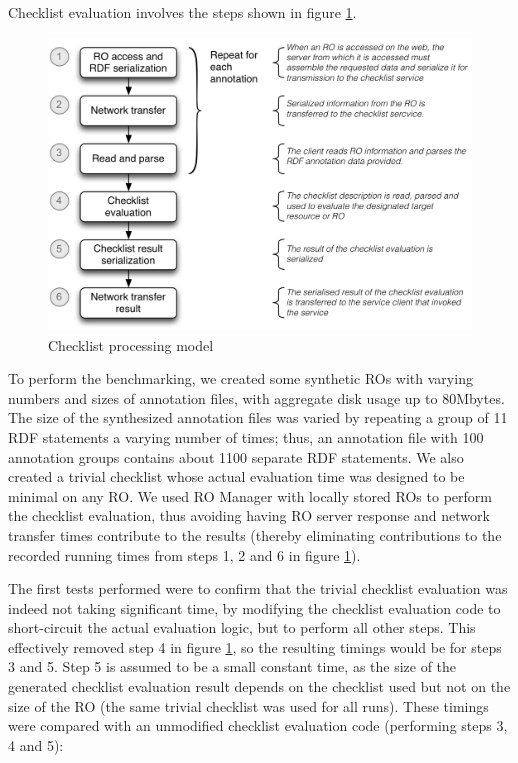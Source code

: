 \pagebreak [3]

Checklist evaluation involves the steps shown in figure
\ref{processing}.

\begin{figure}[htbp]
\centering
\includegraphics{figures/minim-evaluation-sequence.png}
\caption{Checklist processing model \label{processing}}
\end{figure}

To perform the benchmarking, we created some synthetic ROs with varying
numbers and sizes of annotation files, with aggregate disk usage up to
80Mbytes. The size of the synthesized annotation files was varied by
repeating a group of 11 RDF statements a varying number of times; thus,
an annotation file with 100 annotation groups contains about 1100
separate RDF statements. We also created a trivial checklist whose
actual evaluation time was designed to be minimal on any RO. We used RO
Manager with locally stored ROs to perform the checklist evaluation,
thus avoiding having RO server response and network transfer times
contribute to the results (thereby eliminating contributions to the
recorded running times from steps 1, 2 and 6 in figure
\ref{processing}).

The first tests performed were to confirm that the trivial checklist
evaluation was indeed not taking significant time, by modifying the
checklist evaluation code to short-circuit the actual evaluation logic,
but to perform all other steps. This effectively removed step 4 in
figure \ref{processing}, so the resulting timings would be for steps 3
and 5. Step 5 is assumed to be a small constant time, as the size of the
generated checklist evaluation result depends on the checklist used but
not on the size of the RO (the same trivial checklist was used for all
runs). These timings were compared with an unmodified checklist
evaluation code (performing steps 3, 4 and 5):

